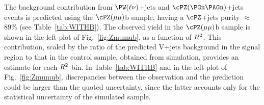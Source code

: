 The background contribution from $\PW(\ell \nu)$+jets and $\cPZ(\PGn\PAGn)$+jets events is predicted using the $\cPZ(\mu\mu)$b sample,
having a $\cPZ$+jets purity ${\approx}$89\% (see
Table~\ref{tab:WITHB}). The observed yield in the $\cPZ(\mu\mu)$b
sample is shown in the left plot of Fig.~\ref{fig:Zmumub}, as a
function of $R^2$. This contribution, scaled by the ratio of the predicted V+jets background in the signal region to that in the control sample, obtained from simulation, provides an
estimate for each $R^2$ bin. In Table~\ref{tab:WITHB}  and
in the left plot of Fig.~\ref{fig:Zmumub}, discrepancies between the observation and the prediction could be
larger than the quoted uncertainty, since the latter accounts only for the
statistical uncertainty of the simulated sample.
\begin{table}
\centering
{}
\end{table}
